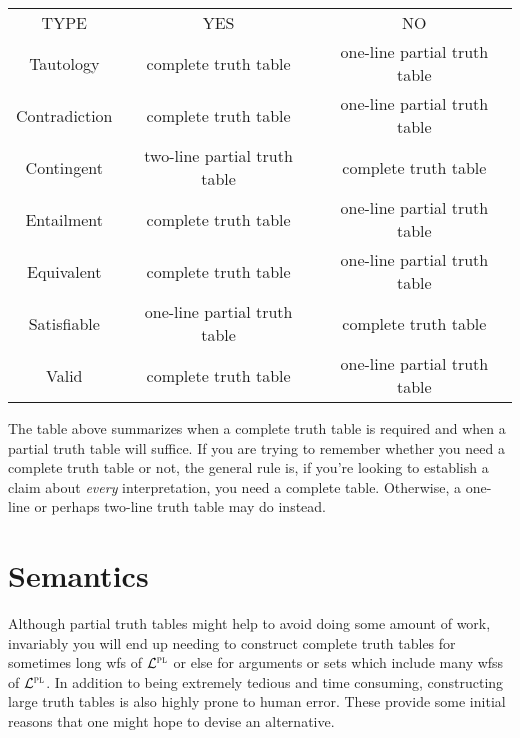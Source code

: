 \begin{table}[ht]
\begin{center}
\begin{tabular}{|c|c|c|}
\cline{1-3}
TYPE & YES & NO\\
\cline{1-3}
Tautology & complete truth table & one-line partial truth table\\
Contradiction &  complete truth table  & one-line partial truth table\\
Contingent & two-line partial truth table & complete truth table\\
Entailment & complete truth table & one-line partial truth table\\
Equivalent & complete truth table & one-line partial truth table\\
Satisfiable & one-line partial truth table & complete truth table\\
Valid & complete truth table & one-line partial truth table\\
\cline{1-3}
\end{tabular}
\end{center}
\end{table}

The table above summarizes when a complete truth table is required and when a partial truth table will suffice.
If you are trying to remember whether you need a complete truth table or not, the general rule is, if you're looking to establish a claim about \emph{every} interpretation, you need a complete table.
Otherwise, a one-line or perhaps two-line truth table may do instead.







\section{Semantics}%
  \label{sec:Semantics}

Although partial truth tables might help to avoid doing some amount of work, invariably you will end up needing to construct complete truth tables for sometimes long wfs of $\mathcal{L}^{\textsc{pl}}$ or else for arguments or sets which include many wfss of $\mathcal{L}^{\textsc{pl}}$.
In addition to being extremely tedious and time consuming, constructing large truth tables is also highly prone to human error.
These provide some initial reasons that one might hope to devise an alternative.

